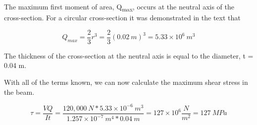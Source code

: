 \documentclass[
  letterpaper,
  DIV=11,
  numbers=noendperiod]{scrreprt}
\begin{document}
\begin{tcolorbox}
\begin{tcolorbox}
The maximum first moment of area, Q\textsubscript{max}, occurs at the
neutral axis of the cross-section. For a circular cross-section it was
demonstrated in the text that

\[
Q_{max}=\frac{2}{3}r^3=\frac{2}{3}(0.02{~m})^3=5.33\times10^6{~m}^3
\]

The thickness of the cross-section at the neutral axis is equal to the
diameter, t = 0.04 m.

With all of the terms known, we can now calculate the maximum shear
stress in the beam.

\[
\tau=\frac{V Q}{I t}=\frac{120,000{~N} * 5.33 \times 10^{-6}{~m}^3}{1.257 \times 10^{-7}{~m}^4 * 0.04{~m}}=127\times10^6\frac{N}{m^2}=127{~MPa}
\]

\end{tcolorbox}

\end{tcolorbox}
\end{document}
